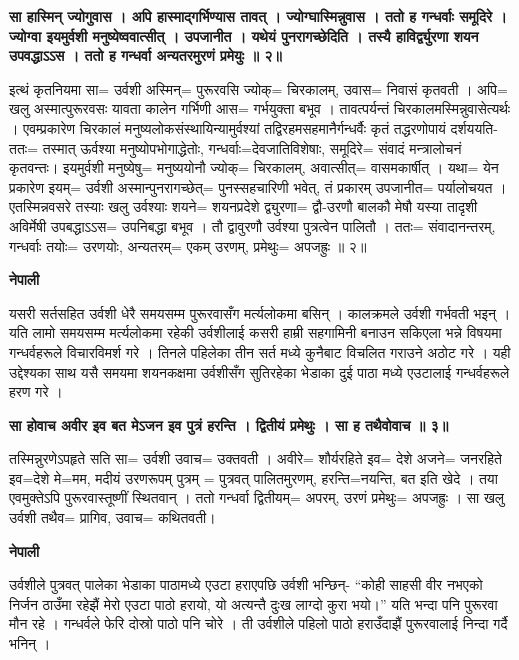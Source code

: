 \documentclass[11pt, a5paper]{article}
\begin{document}
\textbf{सा हास्मिन् ज्योगुवास । अपि हास्माद्‌गर्भिण्यास तावत् । ज्योग्घास्मिन्नुवास । ततो ह गन्धर्वाः समूदिरे । ज्योग्वा इयमुर्वशी मनुष्येष्ववात्सीत् । उपजानीत । यथेयं पुनरागच्छेदिति । तस्यै हाविर्द्व्युरणा शयन उपवद्धाऽऽस । ततो ह गन्धर्वा अन्यतरमुरणं प्रमेयुः ॥ २॥}

इत्थं कृतनियमा सा= उर्वशी अस्मिन्= पुरूरवसि ज्योक्= चिरकालम्, उवास= निवासं कृतवती । अपि= खलु अस्मात्पुरूरवसः यावता कालेन गर्भिणी आस= गर्भयुक्ता बभूव । तावत्पर्यन्तं चिरकालमस्मिन्नुवासेत्यर्थः । एवम्प्रकारेण चिरकालं मनुष्यलोकसंस्थायिन्यामुर्वश्यां तद्विरहमसहमानैर्गन्धर्वैः कृतं तद्धरणोपायं दर्शययति- ततः= तस्मात् ऊर्वश्या मनुष्योपभोगाद्धेतोः, गन्धर्वाः=देवजातिविशेषाः, समूदिरे= संवादं मन्त्रालोचनं कृतवन्तः। इयमुर्वशी मनुष्येषु= मनुष्ययोनौ ज्योक्= चिरकालम्, अवात्सीत्= वासमकार्षीत् । यथा= येन प्रकारेण इयम्= उर्वशी अस्मान्पुनरागच्छेत्= पुनस्सहचारिणी भवेत्, तं प्रकारम् उपजानीत= पर्यालोचयत । एतस्मिन्नवसरे तस्याः खलु उर्वश्याः शयने= शयनप्रदेशे द्व्युरणा= द्वौ-उरणौ बालकौ मेषौ यस्या तादृशी अविर्मेषी उपबद्धाऽऽस= उपनिबद्धा बभूव । तौ द्वावुरणौ उर्वश्या पुत्रत्वेन पालितौ । ततः= संवादानन्तरम्, गन्धर्वाः तयोः= उरणयोः, अन्यतरम्= एकम् उरणम्, प्रमेथुः= अपजह्रुः ॥ २॥

\textbf{नेपाली}

यसरी सर्तसहित उर्वशी धेरै समयसम्म पुरूरवासँग मर्त्यलोकमा बसिन् । कालक्रमले उर्वशी गर्भवती भइन् । यति लामो समयसम्म मर्त्यलोकमा रहेकी उर्वशीलाई कसरी हाम्री सहगामिनी बनाउन सकिएला भन्ने विषयमा गन्धर्वहरूले विचारविमर्श गरे । तिनले पहिलेका तीन सर्त मध्ये कुनैबाट विचलित गराउने अठोट गरे ।  यही उद्देश्यका साथ यसै समयमा शयनकक्षमा उर्वशीसँग सुतिरहेका भेडाका दुई पाठा मध्ये एउटालाई गन्धर्वहरूले हरण गरे ।

\textbf{सा होवाच अवीर इव बत मेऽजन इव पुत्रं हरन्ति । द्वितीयं प्रमेथुः  ।  सा ह तथैवोवाच ॥ ३॥}

तस्मिन्नुरणेऽपहृते सति सा= उर्वशी उवाच= उक्तवती । अवीरे= शौर्यरहिते इव= देशे अजने= जनरहिते इव=देशे मे=मम, मदीयं उरणरूपम् पुत्रम् = पुत्रवत् पालितमुरणम्, हरन्ति=नयन्ति, बत इति खेदे । तया एवमुक्तेऽपि पुरूरवास्तूष्णीं स्थितवान् । ततो गन्धर्वा द्वितीयम्= अपरम्, उरणं प्रमेथुः= अपजह्रुः । सा खलु उर्वशी तथैव= प्रागिव, उवाच= कथितवती।

\textbf{नेपाली}

उर्वशीले पुत्रवत् पालेका भेडाका पाठामध्ये एउटा हराएपछि उर्वशी भन्छिन्- “कोही साहसी वीर नभएको निर्जन ठाउँमा रहेझैं मेरो एउटा पाठो हरायो, यो अत्यन्तै दुःख लाग्दो कुरा भयो।” यति भन्दा पनि पुरूरवा मौन रहे । गन्धर्वले फेरि दोस्रो पाठो पनि चोरे । ती उर्वशीले पहिलो पाठो हराउँदाझैं पुरूरवालाई निन्दा गर्दै भनिन् ।
\end{document}
